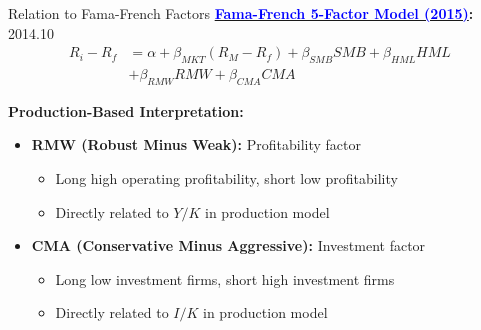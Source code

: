\documentclass{beamer}
\begin{document}
\begin{frame}{Relation to Fama-French Factors}
    \textbf{\href{https://doi.org/10.1016/j.jfineco.2014.10.010}{\textcolor{blue}{Fama-French 5-Factor Model (2015)}}:} 2014.10
    \begin{equation*}
    \begin{aligned}
        R_i - R_f &= \alpha + \beta_{MKT}(R_M - R_f) + \beta_{SMB}SMB + \beta_{HML}HML \\ 
        &+ \beta_{RMW}RMW + \beta_{CMA}CMA
    \end{aligned}
    \end{equation*}
    
    \textbf{Production-Based Interpretation:}
    \begin{itemize}
        \item \textbf{RMW (Robust Minus Weak):} Profitability factor
        \begin{itemize}
            \item Long high operating profitability, short low profitability
            \item Directly related to $Y/K$ in production model
        \end{itemize}
        
        \item \textbf{CMA (Conservative Minus Aggressive):} Investment factor
        \begin{itemize}
            \item Long low investment firms, short high investment firms
            \item Directly related to $I/K$ in production model
        \end{itemize}
    \end{itemize}
\end{frame}
\end{document}
